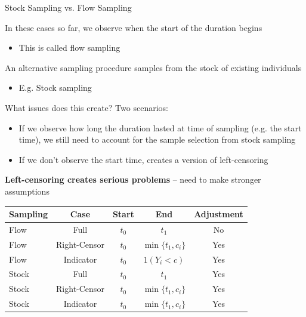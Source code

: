\documentclass[notes,11pt, aspectratio=169]{beamer}
\newenvironment{wideitemize}{\itemize\addtolength{\itemsep}{10pt}}{\enditemize}
\begin{document}
\begin{frame}{Stock Sampling vs. Flow Sampling}
  \begin{wideitemize}
  \item In these cases so far, we observe when the start of the duration begins
    \begin{itemize}
    \item This is called flow sampling
    \end{itemize}
  \item An alternative sampling procedure samples from the stock of existing individuals
    \begin{itemize}
    \item E.g. Stock sampling
    \end{itemize}
  \item What issues does this create? Two scenarios:
    \begin{itemize}
    \item If we observe how long the duration lasted at time of
      sampling (e.g. the start time), we still need to account for the
      sample selection from stock sampling
    \item If we don't observe the start time, creates a version of
      left-censoring
    \end{itemize}
    \vspace{-5pt}
  \item \textbf{Left-censoring creates serious problems} -- need to make
    stronger assumptions
  \end{wideitemize}
  \begin{center}
    \footnotesize
    \begin{tabular}{lcccc}
      Sampling & Case & Start & End & Adjustment\\
      \midrule
      Flow & Full & $t_{0}$ & $t_{1}$ & No \\
      Flow & Right-Censor & $t_{0}$ & $\min\{{t_{1}, c_{i}}\}$ & Yes\\
      Flow & Indicator   & $t_{0}$ & $1(Y_{i} < c)$ & Yes\\
      Stock & Full & $t_{0}$ & $t_{1}$ & Yes \\
      Stock & Right-Censor & $t_{0}$ & $\min\{{t_{1}, c_{i}}\}$ & Yes\\
      Stock & Indicator & $t_{0}$ & $\min\{{t_{1}, c_{i}}\}$ & Yes\\      
    \end{tabular}
  \end{center}
\end{frame}
\end{document}
